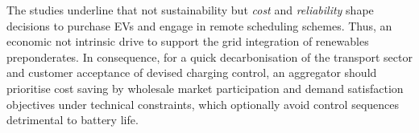 The studies underline that not sustainability but \textit{cost} and \textit{reliability} shape decisions to purchase EVs and engage in remote scheduling schemes. Thus, an economic not intrinsic drive to support the grid integration of renewables preponderates. In consequence, for a quick decarbonisation of the transport sector and customer acceptance of devised charging control, an aggregator should prioritise cost saving by wholesale market participation and demand satisfaction objectives under technical constraints, which optionally avoid control sequences detrimental to battery life.


